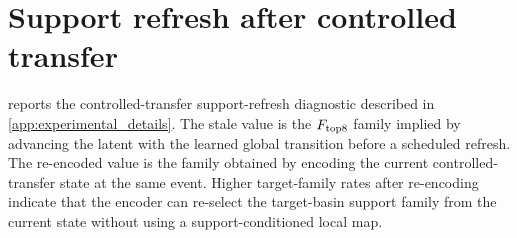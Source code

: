 \section{Support refresh after controlled transfer}
\label{app:support_refresh}

 reports the controlled-transfer support-refresh diagnostic described in \cref{app:experimental_details}. The stale value is the \(F_{\rm top8}\) family implied by advancing the latent with the learned global transition before a scheduled refresh. The re-encoded value is the family obtained by encoding the current controlled-transfer state at the same event. Higher target-family rates after re-encoding indicate that the encoder can re-select the target-basin support family from the current state without using a support-conditioned local map.

\begin{table}[tbp]
\centering
\caption{Controlled-transfer support-refresh diagnostic. Cells report target-family fraction before re-encoding \(\to\) after re-encoding for period \(m\); the no-transfer column is a false-target control where lower is better.}
\label{tab:support_refresh}
\resizebox{\textwidth}{!}{}
\end{table}
